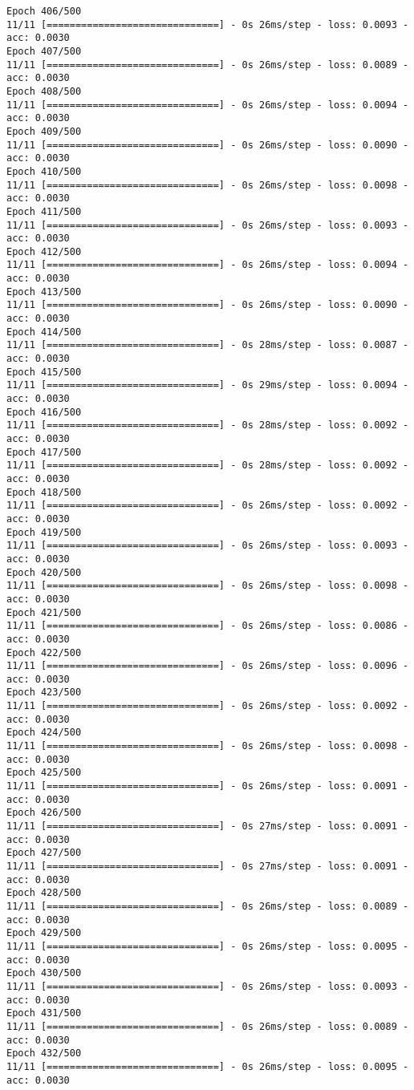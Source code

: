 \documentclass[11pt]{article}
\begin{document}
\begin{Verbatim}[commandchars=\\\{\}]
Epoch 406/500
11/11 [==============================] - 0s 26ms/step - loss: 0.0093 - acc: 0.0030
Epoch 407/500
11/11 [==============================] - 0s 26ms/step - loss: 0.0089 - acc: 0.0030
Epoch 408/500
11/11 [==============================] - 0s 26ms/step - loss: 0.0094 - acc: 0.0030
Epoch 409/500
11/11 [==============================] - 0s 26ms/step - loss: 0.0090 - acc: 0.0030
Epoch 410/500
11/11 [==============================] - 0s 26ms/step - loss: 0.0098 - acc: 0.0030
Epoch 411/500
11/11 [==============================] - 0s 26ms/step - loss: 0.0093 - acc: 0.0030
Epoch 412/500
11/11 [==============================] - 0s 26ms/step - loss: 0.0094 - acc: 0.0030
Epoch 413/500
11/11 [==============================] - 0s 26ms/step - loss: 0.0090 - acc: 0.0030
Epoch 414/500
11/11 [==============================] - 0s 28ms/step - loss: 0.0087 - acc: 0.0030
Epoch 415/500
11/11 [==============================] - 0s 29ms/step - loss: 0.0094 - acc: 0.0030
Epoch 416/500
11/11 [==============================] - 0s 28ms/step - loss: 0.0092 - acc: 0.0030
Epoch 417/500
11/11 [==============================] - 0s 28ms/step - loss: 0.0092 - acc: 0.0030
Epoch 418/500
11/11 [==============================] - 0s 26ms/step - loss: 0.0092 - acc: 0.0030
Epoch 419/500
11/11 [==============================] - 0s 26ms/step - loss: 0.0093 - acc: 0.0030
Epoch 420/500
11/11 [==============================] - 0s 26ms/step - loss: 0.0098 - acc: 0.0030
Epoch 421/500
11/11 [==============================] - 0s 26ms/step - loss: 0.0086 - acc: 0.0030
Epoch 422/500
11/11 [==============================] - 0s 26ms/step - loss: 0.0096 - acc: 0.0030
Epoch 423/500
11/11 [==============================] - 0s 26ms/step - loss: 0.0092 - acc: 0.0030
Epoch 424/500
11/11 [==============================] - 0s 26ms/step - loss: 0.0098 - acc: 0.0030
Epoch 425/500
11/11 [==============================] - 0s 26ms/step - loss: 0.0091 - acc: 0.0030
Epoch 426/500
11/11 [==============================] - 0s 27ms/step - loss: 0.0091 - acc: 0.0030
Epoch 427/500
11/11 [==============================] - 0s 27ms/step - loss: 0.0091 - acc: 0.0030
Epoch 428/500
11/11 [==============================] - 0s 26ms/step - loss: 0.0089 - acc: 0.0030
Epoch 429/500
11/11 [==============================] - 0s 26ms/step - loss: 0.0095 - acc: 0.0030
Epoch 430/500
11/11 [==============================] - 0s 26ms/step - loss: 0.0093 - acc: 0.0030
Epoch 431/500
11/11 [==============================] - 0s 26ms/step - loss: 0.0089 - acc: 0.0030
Epoch 432/500
11/11 [==============================] - 0s 26ms/step - loss: 0.0095 - acc: 0.0030

\end{Verbatim}
\end{document}
